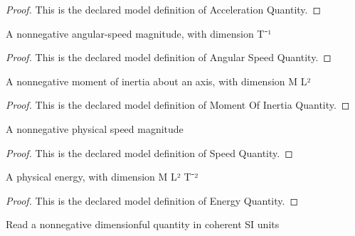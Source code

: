 \begin{proof}
  This is the declared model definition of Acceleration Quantity.
\end{proof}
\begin{definition}
  \label{def:physics:phyx-mini-0699:phyxminiproblems-problemphyxmini0699-angularspeedquantity}
  A nonnegative angular-speed magnitude, with dimension T⁻¹
\end{definition}
\begin{proof}
  This is the declared model definition of Angular Speed Quantity.
\end{proof}
\begin{definition}
  \label{def:physics:phyx-mini-0699:phyxminiproblems-problemphyxmini0699-momentofinertiaquantity}
  A nonnegative moment of inertia about an axis, with dimension M L²
\end{definition}
\begin{proof}
  This is the declared model definition of Moment Of Inertia Quantity.
\end{proof}
\begin{definition}
  \label{def:physics:phyx-mini-0699:phyxminiproblems-problemphyxmini0699-speedquantity}
  A nonnegative physical speed magnitude
\end{definition}
\begin{proof}
  This is the declared model definition of Speed Quantity.
\end{proof}
\begin{definition}
  \label{def:physics:phyx-mini-0699:phyxminiproblems-problemphyxmini0699-energyquantity}
  A physical energy, with dimension M L² T⁻²
\end{definition}
\begin{proof}
  This is the declared model definition of Energy Quantity.
\end{proof}
\begin{definition}
  \label{def:physics:phyx-mini-0699:phyxminiproblems-problemphyxmini0699-nonnegativesireadout}
  Read a nonnegative dimensionful quantity in coherent SI units
\end{definition}
